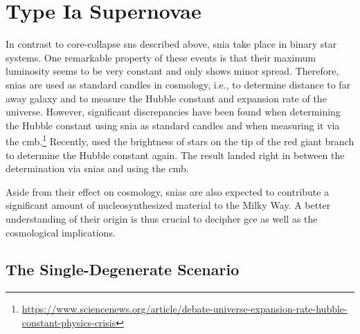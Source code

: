 \section{Type Ia Supernovae}

In contrast to core-collapse \acp{sn} described above, \ac{snia} take place in binary star systems. One remarkable property of these events is that their maximum luminosity seems to be very constant and only shows minor spread. Therefore, \acp{snia} are used as standard candles in cosmology, i.e., to determine distance to far away galaxy and to measure the Hubble constant and expansion rate of the universe. However, significant discrepancies have been found when determining the Hubble constant using \ac{snia} as standard candles and when measuring it via the \ac{cmb}.\footnote{\url{https://www.sciencenews.org/article/debate-universe-expansion-rate-hubble-constant-physics-crisis}} Recently, \citet{freedman19} used the brightness of stars on the tip of the red giant branch to determine the Hubble constant again. The result landed right in between the determination via \acp{snia} and using the \ac{cmb}. 

Aside from their effect on cosmology, \acp{snia} are also expected to contribute a significant amount of nucleosynthesized material to the Milky Way. A better understanding of their origin is thus crucial to decipher \ac{gce} as well as the cosmological implications.


\subsection{The Single-Degenerate Scenario}

